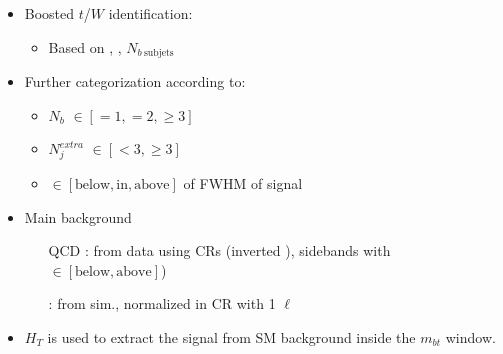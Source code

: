 {  \vspace{-0.2cm}

  \begin{itemize}
    \small
  \item Boosted $t$/$W$ identification:
    \begin{itemize}
      \setlength{\itemindent}{1mm}
      \footnotesize
    \item Based on \mSD[], , $N_{b
      \ \text{subjets}}$
    \end{itemize}
  \item Further categorization according to:
    \begin{itemize}
      \setlength{\itemindent}{1mm}
      \footnotesize
    \item $N_{b}$ $\in [=1, =2, \geq 3]$
    \item $N_{j}^{extra}$ $\in [< 3, \geq 3]$
    \item \mHpmReco $\in [\text{below}, \text{in}, \text{above}]$ of FWHM of signal
    \end{itemize}
  \end{itemize}


  \twoColumns
      {
        \begin{itemize}
          \small
        \item Main background
          \begin{itemize}
            \footnotesize
          \item[QCD]: from data using CRs (inverted
            ), sidebands with \mHpmReco
            $\in [\text{below},\text{above}]$)
          \item[\ttbar]: from sim., normalized in CR with 1
            $\ell$
          \end{itemize}
        \end{itemize}
      }
      {
        
        \vspace{-3cm}
      }

      \vspace{+0.1cm}
      
      \begin{itemize}
        \small
        \item $H_{T}$ is used to extract the signal from SM background inside the $m_{bt}$ window.
      \end{itemize}
}

